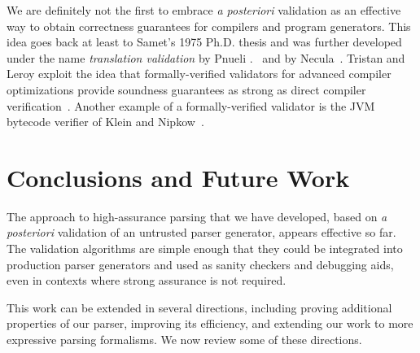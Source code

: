 \documentclass{llncs}
\begin{document}

We are definitely not the first to embrace {\em a posteriori}
validation as an effective way to obtain correctness guarantees for
compilers and program generators.  This idea goes back at least to
Samet's 1975 Ph.D. thesis \cite{Samet-phd} and was further developed
under the name {\em translation validation} by Pnueli
\etal.~\citeyear{Pnueli-SS-98} and by Necula~\citeyear{Necula-00}.
Tristan and Leroy exploit the idea that formally-verified
validators for advanced compiler optimizations provide soundness
guarantees as strong as direct compiler
verification~\citeyear{Tristan-Leroy-softpipe}.  Another example of a
formally-verified validator is the JVM bytecode verifier of Klein and
Nipkow~\citeyear{Klein-Nipkow-jinja}.


\section{Conclusions and Future Work}
\label{sec:future}


The approach to high-assurance parsing that we have developed, based
on {\em a posteriori} validation of an untrusted parser
generator, appears effective so far.  The validation algorithms are
simple enough that they could be integrated into production
parser generators and used as sanity checkers and debugging aids, even
in contexts where strong assurance is not required.

This work can be extended in several directions, including proving additional
properties of our \lrone parser, improving its efficiency, and extending our
work to more expressive parsing formalisms. We now review some of these
directions.

\end{document}
